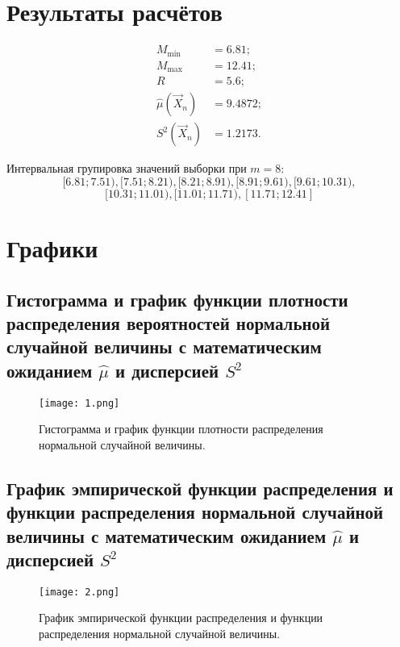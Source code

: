 
\section{Результаты расчётов}

\begin{align*}
    M_{\min} &= 6.81; \\
    M_{\max} &= 12.41; \\
    R &= 5.6; \\
    \hat{\mu}(\vec{X}_n) &= 9.4872; \\
    S^2(\vec{X}_n) &= 1.2173.
\end{align*}

\noindent 
Интервальная групировка значений выборки при $m = 8$:
\[
    [6.81;7.51),	[7.51;8.21),	[8.21;8.91),	[8.91;9.61),	[9.61;10.31),
\]
\[
   [10.31;11.01),	[11.01;11.71),	[11.71;12.41]
\]



\section{Графики}

\subsection{Гистограмма и график функции плотности распределения вероятностей нормальной случайной величины с математическим ожиданием $\hat{\mu}$ и дисперсией $S^2$}


\begin{figure}[h]
    \centering
    \texttt{[image: 1.png]}
    \caption{Гистограмма и график функции плотности распределения нормальной случайной величины.}
\end{figure}



\newpage
\subsection{График эмпирической функции распределения и функции распределения нормальной случайной величины с математическим ожиданием $\hat{\mu}$ и дисперсией $S^2$}

\begin{figure}[h]
    \centering
    \texttt{[image: 2.png]}
    \caption{График эмпирической функции распределения и функции распределения нормальной случайной величины.}
\end{figure}